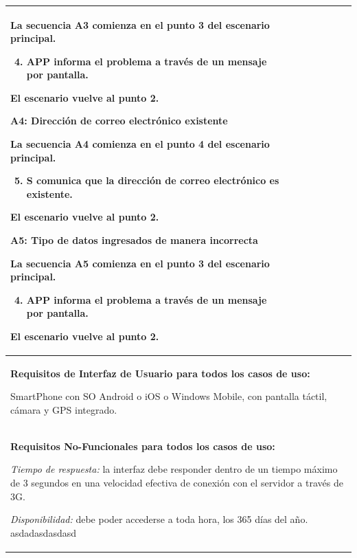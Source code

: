 \begin{longtable}{|l|p{5.5cm}|l|p{2cm}|l|p{1.9cm}|}
{    La secuencia A3 comienza en el punto 3 del escenario principal.
    \begin{enumerate}
        \setcounter{enumi}{3}
        \item APP informa el problema a través de un mensaje por pantalla.
    \end{enumerate}

    El escenario vuelve al punto 2.

    \textbf{A4: Dirección de correo electrónico existente}
    
    La secuencia A4 comienza en el punto 4 del escenario principal.
    \begin{enumerate}
        \setcounter{enumi}{4}
        \item S comunica que la dirección de correo electrónico es existente.
    \end{enumerate}

    El escenario vuelve al punto 2.

    \textbf{A5: Tipo de datos ingresados de manera incorrecta}
    
    La secuencia A5 comienza en el punto 3 del escenario principal.
    \begin{enumerate}
        \setcounter{enumi}{3}
        \item APP informa el problema a través de un mensaje por pantalla.
    \end{enumerate}

    El escenario vuelve al punto 2.

    } \\ \hline

    \multicolumn{6}{|p{15cm}|}{ \textbf{Requisitos de Interfaz de Usuario para todos los casos de uso: }

    SmartPhone con SO Android o iOS o Windows Mobile, con pantalla táctil, cámara y GPS integrado.
    
    } \\ \hline

    \multicolumn{6}{|p{15cm}|}{ \textbf{Requisitos No-Funcionales para todos los casos de uso: }

    \emph{Tiempo de respuesta:} la interfaz debe responder dentro de un tiempo máximo de 3 segundos en una velocidad efectiva de conexión con el servidor a través de 3G.

    \emph{Disponibilidad:} debe poder accederse a toda hora, los 365 días del año. asdadasdasdasd

    } \\ \hline

\end{longtable}



